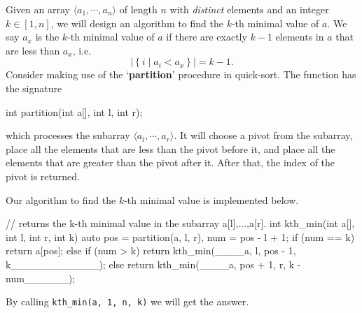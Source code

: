 
Given an array \(\langle a_1,\cdots,a_n\rangle\) of length \(n\) with \emph{distinct} elements and an integer \(k\in[1,n]\), we will design an algorithm to find the \(k\)-th minimal value of \(a\). We say \(a_x\) is the \(k\)-th minimal value of \(a\) if there are exactly \(k-1\) elements in \(a\) that are less than \(a_x\), i.e.
\[\left|\left\{i\mid a_i<a_x\right\}\right|=k-1.\]
Consider making use of the `\textbf{partition}' procedure in quick-sort. The function has the signature
\begin{cpp}
  int partition(int a[], int l, int r);
\end{cpp}
which processes the subarray \(\langle a_l,\cdots,a_r\rangle\). It will choose a pivot from the subarray, place all the elements that are less than the pivot before it, and place all the elements that are greater than the pivot after it. After that, the index of the pivot is returned.

Our algorithm to find the \(k\)-th minimal value is implemented below.
\begin{cpp}
  // returns the k-th minimal value in the subarray a[l],...,a[r].
  int kth_min(int a[], int l, int r, int k) {
    auto pos = partition(a, l, r), num = pos - l + 1;
    if (num == k)
      return a[pos];
    else if (num > k)
      return kth_min(____a, l, pos - 1, k____________);
    else
      return kth_min(____a, pos + 1, r, k - num______);
  }
\end{cpp}
By calling \lstinline{kth_min(a, 1, n, k)} we will get the answer.

